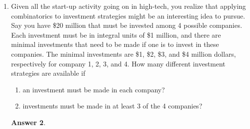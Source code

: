 \documentclass[12pt]{article}
\renewcommand{\(}{\left(}
\renewcommand{\)}{\right)}
\theoremstyle{definition}
\newtheorem*{answer}{Answer}
\begin{document}
\begin{enumerate}
    \begin{enumerate}[label=\alph*.]

    \item If a student is chosen randomly at the university, what is the probability that the student is not in any of the 3 programming classes?
    \item If a student is chosen randomly at the university, what is the probability that the student is taking \emph{exactly one} of the three programming classes?
    \item If two different students are chosen randomly at the university, what is the probability that at least one of the chosen students is taking at least one of the programming classes?

    \end{enumerate}

    \begin{shaded}
    \begin{answer}

    \end{answer}
    \end{shaded}
    \newpage


\item Given all the start-up activity going on in high-tech, you realize that applying combinatorics to investment strategies might be an interesting idea to pursue.  Say you have \$20 million that must be invested among 4 possible companies.  Each investment must be in integral units of \$1 million, and there are minimal investments that need to be made if one is to invest in these companies.  The minimal investments are \$1, \$2, \$3, and \$4 million dollars, respectively for company 1, 2, 3, and 4.  How many different investment strategies are available if
    \begin{enumerate}[label=\alph*.]

    \item an investment must be made in each company?
    \item investments must be made in at least 3 of the 4 companies?

    \end{enumerate}

    \begin{shaded}
    \begin{answer}

    \end{answer}
    \end{shaded}
    \newpage



\end{enumerate}
\end{document}
